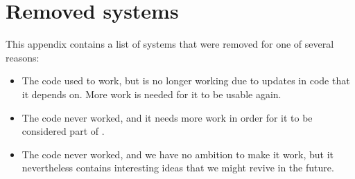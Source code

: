 \chapter{Removed systems}

This appendix contains a list of systems that were removed for one of
several reasons:

\begin{itemize}
\item The code used to work, but is no longer working due to updates
  in code that it depends on.  More work is needed for it to be usable
  again.
\item The code never worked, and it needs more work in order for it to
  be considered part of \sysname{}.
\item The code never worked, and we have no ambition to make it work,
  but it nevertheless contains interesting ideas that we might revive
  in the future.
\end{itemize}
